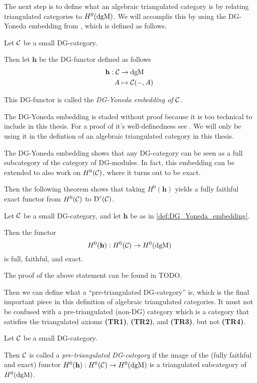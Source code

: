 The next step is to define what an algebraic triangulated category is by relating triangulated categories to \( H^0(\operatorname{dgM}) \). We will accomplis this by using the DG-Yoneda embedding from \cite[Corollary 6.3.6]{Borceux_1994}, which is defined as follows.
\begin{definition}
    \label{def:DG_Yoneda_embedding}
    Let \( {\mathcal{C}} \) be a small DG-category.
    
    Then let \( \mathbf{h} \) be the DG-functor defined as follows
    \begin{align*}
        \mathbf{h}: {\mathcal{C}} &\to \operatorname{dgM} \\
        A &\mapsto {\mathcal{C}}(-, A)
    \end{align*}

    This DG-functor is called the \emph{DG-Yoneda embedding of \( {\mathcal{C}} \)}.
\end{definition}

The DG-Yoneda embedding is staded without proof because it is too technical to include in this thesis. For a proof of it's well-definedness see \cite[Corollary 6.3.6]{Borceux_1994}. We will only be using it in the defintion of an algebraic triangulated category in this thesis.

The DG-Yoneda embedding shows that any DG-category can be seen as a full subcategory of the category of DG-modules. In fact, this embedding can be extended to also work on \( H^0({\mathcal{C}}) \), where it turns out to be exact.

Then the following theorem shows that taking \( H^0(\mathbf{h}) \) yields a fully faithful exact functor from \( H^0({\mathcal{C}}) \) to \( \operatorname{D}^c({\mathcal{C}}) \).

\begin{theorem}
    Let \( {\mathcal{C}} \) be a small DG-category, and let \( \mathbf{h} \) be as in \autoref{def:DG_Yoneda_embedding}.

    Then the functor
    \[
        H^0(\mathbf{h}): H^0({\mathcal{C}}) \to H^0(\operatorname{dgM})
    \]
    is full, faithful, and exact.
\end{theorem}
The proof of the above statement can be found in TODO.

Then we can define what a ``pre-triangulated DG-category'' is, which is the final important piece in this definition of algebraic triangulated categories. It must not be confused with a pre-triangulated (non-DG) category which is a category that satisfies the triangulated axioms {\bf (TR1)}, {\bf (TR2)}, and {\bf (TR3)}, but not {\bf (TR4)}.
\begin{definition}
    Let \( {\mathcal{C}} \) be a small DG-category.

    Then \( {\mathcal{C}} \) is called a \emph{pre-triangulated DG-category} if the image of the (fully faithful and exact) functor \( H^0(\mathbf{h}): H^0({\mathcal{C}}) \to H^0(\operatorname{dgM}) \) is a triangulated subcategory of \( H^0(\operatorname{dgM}) \).
\end{definition}


